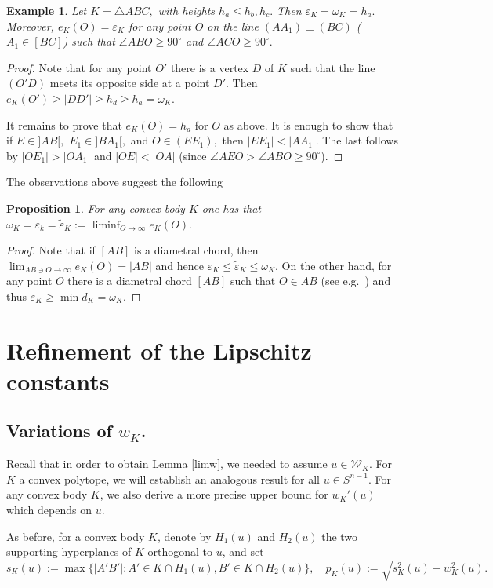 \documentclass[a4paper,12pt]{amsart}
\newtheorem{prop}[thm]{Proposition}
\newtheorem{exam}[thm]{Example}
\def\ds{\displaystyle}
\def\om{\omega}
\def\eps{\varepsilon}
\begin{document}
\begin{exam} Let $K=\triangle ABC,$ with heights $h_a\le h_b, h_c.$ Then $\eps_K=\om_K=h_a.$
Moreover, $e_K(O)=\eps_K$ for any point $O$ on the line $(AA_1)\perp (BC)$ ($A_1\in[BC]$)
such that $\angle ABO\ge 90^\circ$ and $\angle ACO\ge 90^\circ.$
\end{exam}

\begin{proof} Note that for any point $O'$ there is a vertex $D$ of $K$ such that the
line $(O'D)$ meets its opposite side at a point $D'$. Then
$e_K(O')\ge|DD'|\ge h_d\ge h_a=\om_K.$

It remains to prove that $e_K(O)=h_a$ for $O$ as above. It is
enough to show that if $E\in]AB[,$ $E_1\in]BA_1[,$ and
$O\in(EE_1),$ then $|EE_1|<|AA_1|.$ The last follows by
$|OE_1|>|OA_1|$ and $|OE|<|OA|$ (since $\angle AEO>\angle ABO\ge
90^\circ$).
\end{proof}

The observations above suggest the following

\begin{prop} For any convex body $K$ one has that
$\om_K=\eps_k=\tilde\eps_K:=\ds\liminf_{O\to\infty}e_K(O).$
\end{prop}

\begin{proof} Note that if $[AB]$ is a diametral chord, then
$\ds\lim_{AB\ni O\to\infty}e_K(O)=|AB|$ and hence $\eps_K\le\tilde\eps_K\le\om_K.$
On the other hand, for any point $O$ there is a diametral chord $[AB]$ such that
$O\in AB$ (see e.g.~\cite[6.6]{Sol}) and thus $\eps_K\ge\min d_K=\om_K.$
\end{proof}

\section{Refinement of the Lipschitz constants}
\label{refine}

\subsection{Variations of $w_K$.}
\label{varw}

Recall that in order to obtain Lemma \ref{limw}, we needed to assume $u\in \mathcal W_K$.
For $K$ a convex polytope, we will establish an analogous result for all $u\in S^{n-1}$.
For any convex body $K$, we also derive a more precise upper
bound for $w_K'(u)$ which depends on $u$.

As before, for a convex body $K$, denote by $H_1(u)$ and $H_2(u)$ the two supporting hyperplanes
of $K$ orthogonal to $u$, and set
\[
s_K(u):=\max\{|A'B'|: A'\in K\cap H_1(u), B'\in K\cap H_2(u)\},\quad
p_K(u):= \sqrt{ s^2_K(u)-w^2_K(u)}.
\]
\end{document}
